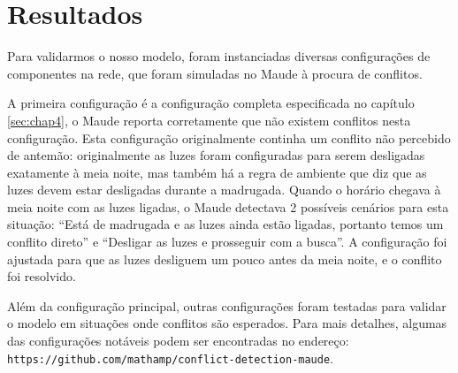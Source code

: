 \section{Resultados} \label{sec:chap6}

Para validarmos o nosso modelo, foram instanciadas diversas configurações de componentes na rede, que foram simuladas no Maude à procura de conflitos. 

A primeira configuração é a configuração completa especificada no capítulo \ref{sec:chap4}, o Maude reporta corretamente que não existem conflitos nesta configuração. Esta configuração originalmente continha um conflito não percebido de antemão: originalmente as luzes foram configuradas para serem desligadas exatamente à meia noite, mas também há a regra de ambiente que diz que as luzes devem estar desligadas durante a madrugada. Quando o horário chegava à meia noite com as luzes ligadas, o Maude detectava 2 possíveis cenários para esta situação: ``Está de madrugada e as luzes ainda estão ligadas, portanto temos um conflito direto'' e ``Desligar as luzes e prosseguir com a busca''. A configuração foi ajustada para que as luzes desliguem um pouco antes da meia noite, e o conflito foi resolvido.

Além da configuração principal, outras configurações foram testadas para validar o modelo em situações onde conflitos são esperados.
Para mais detalhes, algumas das configurações notáveis podem ser encontradas no endereço: \texttt{https://github.com/mathamp/conflict-detection-maude}.